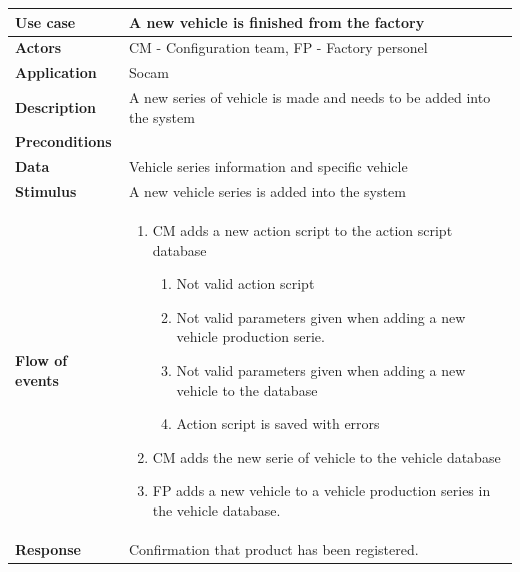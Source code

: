 	\begin{table}[H]
		\centering
		\begin{tabular}{  p{4cm} | p{10cm} }
			\hline
			\rowcolor{gray}
			{\bf Use case} & {\bf A new vehicle is finished from the factory} \\ \hline
			{\bf Actors} & CM - Configuration team, FP - Factory personel \\ \hline
			{\bf Application} & Socam \\ \hline
			{\bf Description} & A new series of vehicle is made and needs to be 
			added into the system \\ \hline
			{\bf Preconditions} & \\ \hline
			{\bf Data} & Vehicle series information and specific vehicle \\ \hline
			{\bf Stimulus} & A new vehicle series is added into the system \\ \hline
			{\bf Flow of events} & 
				\begin{enumerate}[font=\bfseries]
					\item CM adds a new action script to the action script database
						\begin{enumerate}[label*=\arabic*., font=\bfseries]
							\item Not valid action script
							\item Not valid parameters given when adding a new vehicle 
							production serie.
							\item Not valid parameters given when adding a new vehicle 
							to the database
							\item Action script is saved with errors
						\end{enumerate}
					\item CM adds the new serie of vehicle to the vehicle database
					\item FP adds a new vehicle to a vehicle production series in the vehicle database. 
				\end{enumerate}
			
			\\ \hline
			{\bf Response} & Confirmation that product has been registered. \\ \hline
		\end{tabular}
	\end{table}